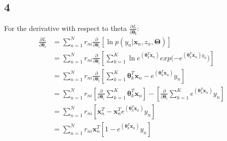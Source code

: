 \documentclass[a4paper]{article}
\begin{document}
\subsection*{4}
For the derivative with respect to theta $\frac{\partial L}{\partial \pmb{\theta_{i}}}$:
\begin{align*}
    \frac{\partial L}{\partial \pmb{\theta}_{i}} &= \sum_{n=1}^{N} r_{ni} \frac{\partial}{\partial \pmb{\theta}_{i}} \left[ \ln{p(y_{n}|\pmb{x}_{n}, z_{n}, \pmb{\Theta})}\right] \\
    &= \sum_{n=1}^{N} r_{ni} \frac{\partial}{\partial \pmb{\theta}_{i}} \left[ 
    \sum_{k=1}^{K} \ln{e^{(\pmb{\theta}_{k}^{T} \pmb{x}_{n})} exp(-e^{(\pmb{\theta}_{k}^{T} \pmb{x}_{n})y_{n}}}) 
    \right] \\
    &= \sum_{n=1}^{N} r_{ni}\frac{\partial}{\partial \pmb{\theta}_{i}} \left[ 
    \sum_{k=1}^{K} \pmb{\theta}_{k}^{T} \pmb{x}_{n} - e^{(\pmb{\theta}_{k}^{T} \pmb{x}_{n})}y_{n}
    \right] \\
    &= \sum_{n=1}^{N} r_{ni}  \left[ \frac{\partial}{\partial \pmb{\theta}_{i}}\sum_{k=1}^{K} \pmb{\theta}_{k}^{T} \pmb{x}_{n}\right] -
    \left[\frac{\partial}{\partial \pmb{\theta}_{i}}\sum_{k=1}^{K} e^{(\pmb{\theta}_{k}^{T} \pmb{x}_{n})}y_{n}\right]\\
    &= \sum_{n=1}^{N} r_{ni} \left[\pmb{x}_{n}^{T} - \pmb{x}_{n}^{T}e^{(\pmb{\theta}_{k}^{T} \pmb{x}_{n})}y_{n}\right]\\
    &=\sum_{n=1}^{N} r_{ni}\pmb{x}_{n}^{T}\left[1 - e^{(\pmb{\theta}_{k}^{T} \pmb{x}_{n})}y_{n}\right]
\end{align*}{}
\end{document}
